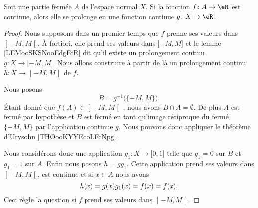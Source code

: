 \begin{theorem}     \label{THOooXKGWooFUYlux}
    Soit une partie fermée \( A\) de l'espace normal \( X\). Si la fonction \( f\colon A\to \eR\) est continue, alors elle se prolonge en une fonction continue \( g\colon X\to \eR\).
\end{theorem}

\begin{proof}
    Nous supposons dans un premier temps que \( f\) prenne ses valeurs dans \( \mathopen] -M , M \mathclose[\). À fortiori, elle prend ses valeurs dans \( \mathopen[ -M , M \mathclose]\) et le lemme \ref{LEMooSKSNooEdgFcR} dit qu'il existe un prolongement continu \( g\colon X\to \mathopen[ -M , M \mathclose]\). Nous allons construire à partir de là un prolongement continu \( h\colon X\to \mathopen] -M , M \mathclose[\) de \( f\).

    Nous posons
    \begin{equation}
        B=g^{-1}\big( \{ -M,M \} \big).
    \end{equation}
    Étant donné que \( f(A)\subset\mathopen] -M , M \mathclose[\) , nous avons \( B\cap A=\emptyset\). De plus \( A\) est fermé par hypothèse et \( B\) est fermé en tant qu'image réciproque du fermé \( \{ -M,M \}\) par l'application continue \( g\). Nous pouvons donc appliquer le théorème d'Urysohn \ref{THOooKYYEooLFcNpg}.

    Nous considérons donc une application \( g_1\colon X\to \mathopen[ 0 , 1 \mathclose]\) telle que \( g_1=0\) sur \( B\) et \( g_1=1\) sur \( A\). Enfin nous posons \( h=gg_1\). Cette application prend ses valeurs dans \( \mathopen] -M , M \mathclose[\), est continue et si \( x\in A\) nous avons
    \begin{equation}
        h(x)=g(x)g_1(x)=f(x)\time 1=f(x).
    \end{equation}
    Ceci règle la question si \( f\) prend ses valeurs dans \( \mathopen] -M , M \mathclose[\).


\end{proof}
